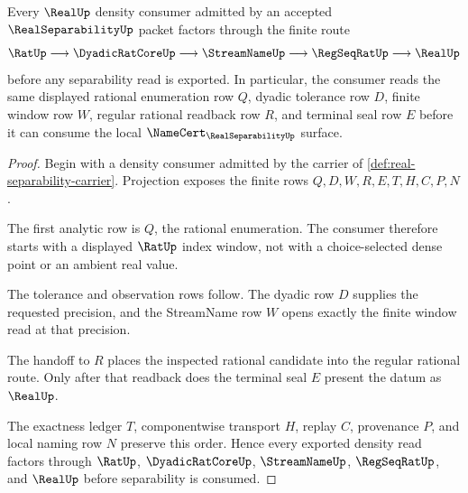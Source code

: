 \begin{theorem}
\label{thm:real-separability-rational-dense-handoff}
Every $\RealUp$ density consumer admitted by an accepted $\RealSeparabilityUp$ packet factors through the finite route
$$
\RatUp \longrightarrow \DyadicRatCoreUp \longrightarrow \StreamNameUp \longrightarrow \RegSeqRatUp \longrightarrow \RealUp
$$
before any separability read is exported. In particular, the consumer reads the same displayed rational enumeration row $Q$, dyadic tolerance row $D$, finite window row $W$, regular rational readback row $R$, and terminal seal row $E$ before it can consume the local $\NameCert_{\RealSeparabilityUp}$ surface.
\end{theorem}
\begin{proof}
Begin with a density consumer admitted by the carrier of \autoref{def:real-separability-carrier}. Projection exposes the finite rows $Q,D,W,R,E,T,H,C,P,N$.

The first analytic row is $Q$, the rational enumeration. The consumer therefore starts with a displayed $\RatUp$ index window, not with a choice-selected dense point or an ambient real value.

The tolerance and observation rows follow. The dyadic row $D$ supplies the requested precision, and the StreamName row $W$ opens exactly the finite window read at that precision.

The handoff to $R$ places the inspected rational candidate into the regular rational route. Only after that readback does the terminal seal $E$ present the datum as $\RealUp$.

The exactness ledger $T$, componentwise transport $H$, replay $C$, provenance $P$, and local naming row $N$ preserve this order. Hence every exported density read factors through $\RatUp$, $\DyadicRatCoreUp$, $\StreamNameUp$, $\RegSeqRatUp$, and $\RealUp$ before separability is consumed.
\end{proof}


